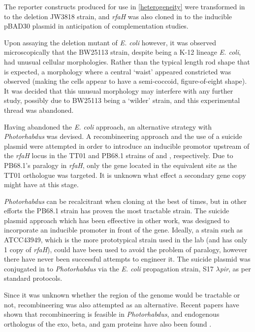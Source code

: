 The reporter constructs produced for use in \vref{heterogeneity} were transformed in to the deletion JW3818 strain, and \emph{rfaH} was also cloned in to the inducible pBAD30 plasmid in anticipation of complementation studies.

Upon assaying the deletion mutant of \emph{E. coli} however, it was observed microscopically that the BW25113 strain, despite being a K-12 lineage \emph{E. coli}, had unusual cellular morphologies. Rather than the typical length rod shape that is expected, a morphology where a central `waist' appeared constricted was observed (making the cells appear to have a semi-coccoid, figure-of-eight shape). It was decided that this unusual morphology may interfere with any further study, possibly due to BW25113 being a `wilder' strain, and this experimental thread was abandoned.

Having abandoned the \emph{E. coli} approach, an alternative strategy with \emph{Photorhabdus} was devised. A recombineering approach and the use of a suicide plasmid were attempted in order to introduce an inducible promotor upstream of the \emph{rfaH} locus in the TT01 and PB68.1 strains of \Plum{} and \Pasy, respectively. Due to \Pasy{} PB68.1's paralogy in \emph{rfaH}, only the gene located in the equivalent site as the TT01 orthologue was targeted. It is unknown what effect a secondary gene copy might have at this stage.

\emph{Photorhabdus} can be recalcitrant when cloning at the best of times, but in other efforts the PB68.1 strain has proven the most tractable \Pasy{} strain. The suicide plasmid approach which has been effeective in other work, was designed to incorporate an inducible promoter in front of the gene. Ideally, a \Pasy{} strain such as ATCC43949, which is the more prototypical \Pasy{} strain used in the lab (and has only 1 copy of \emph{rfaH}), could have been used to avoid the problem of paralogy, however there have never been successful attempts to engineer it. The suicide plasmid was conjugated in to \emph{Photorhabdus} via the \emph{E. coli} propagation strain, S17 $\lambda$\emph{pir}, as per standard protocols.

Since it was unknown whether the region of the genome would be tractable or not, recombineering was also attempted as an alternative. Recent papers have shown that recombineering is feasible in \emph{Photorhabdus}, and endogenous orthologus of the exo, beta, and gam proteins have also been found \citep{Yin2015}.

